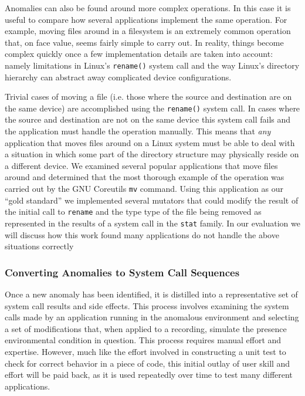 Anomalies can also be found around more complex operations.  In this case
it is useful to compare how several applications implement the same
operation.  For example, moving files
around in a filesystem is an extremely common operation that, on face
value, seems fairly simple to carry out.  In reality, things become
complex quickly once a few implementation details are taken into account:
namely limitations in Linux's {\tt rename()} system call and the way
Linux's directory hierarchy can abstract away complicated device
configurations.

Trivial cases of moving a file (i.e. those where the source and destination
are on the same device) are accomplished using the {\tt rename()} system
call.  In cases where the source and destination are not on the same device
this system call fails and the application must handle the operation
manually. This means that \emph{any} application that moves files around on
a Linux system must be able to deal with a situation in which some part of
the directory structure may physically reside on a different device.
We examined several popular applications that move files around and
determined that the most thorough example of the operation was carried out
by
the GNU Coreutils {\tt mv} command.  Using this application as our
``gold standard''  we implemented several mutators that
could modify the result of the initial call to {\tt rename} and the type
type of the file being removed as represented in the results of a system
call in the {\tt stat} family.
In our evaluation we will discuss how this work found many applications
do not handle the above situations correctly

\subsubsection{Converting Anomalies to System Call Sequences}

Once a new anomaly has been identified, it is distilled into a
representative set of system call results and side effects.
This process involves examining the
system calls made by an application running in the anomalous environment
and selecting a set of modifications that, when applied to a recording,
simulate the presence environmental condition in question.
This process requires manual effort and expertise.  However,
much like
the effort involved in constructing a unit test to check for correct
behavior in a piece of code, this initial outlay of
user skill and effort will be paid back, as it is
used repeatedly over time to test many different applications.

